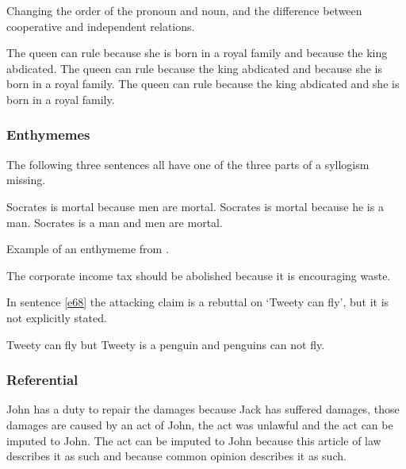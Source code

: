 \noindent Changing the order of the pronoun and noun, and the difference between cooperative and independent relations.
\begin{exe}
\ex\label{e62} The queen can rule because she is born in a royal family and because the king abdicated.
\ex\label{e63} The queen can rule because the king abdicated and because she is born in a royal family.
\ex\label{e71} The queen can rule because the king abdicated and she is born in a royal family.
\end{exe}

\subsubsection{Enthymemes}
The following three sentences all have one of the three parts of a syllogism missing.
\begin{exe}
\ex\label{e64} Socrates is mortal because men are mortal.
\ex\label{e65} Socrates is mortal because he is a man.
\ex\label{e66} Socrates is a man and men are mortal.
\end{exe}

\noindent Example of an enthymeme from \citet{Walton:2005dc}.
\begin{exe}
\ex\label{e67} The corporate income tax should be abolished because it is encouraging waste.
\end{exe}

\noindent In sentence \ref{e68} the attacking claim is a rebuttal on `Tweety can fly', but it is not explicitly stated.
\begin{exe}
\ex\label{e68} Tweety can fly but Tweety is a penguin and penguins can not fly.
\end{exe}

\subsubsection{Referential}
\begin{exe}
\ex\label{e69} John has a duty to repair the damages because Jack has suffered damages, those damages are caused by an act of John, the act was unlawful and the act can be imputed to John. The act can be imputed to John because this article of law describes it as such and because common opinion describes it as such.
\end{exe}